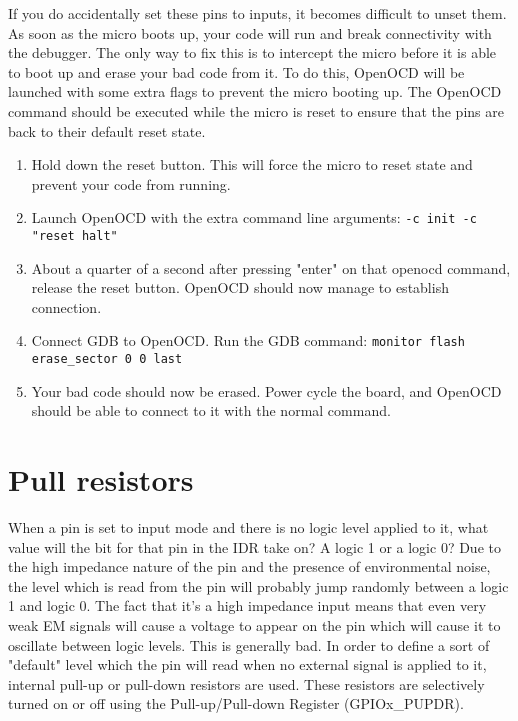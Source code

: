 If you do accidentally set these pins to inputs, it becomes difficult to unset them. As soon as the micro boots up, your code will run and break connectivity with the debugger. The only way to fix this is to intercept the micro before it is able to boot up and erase your bad code from it.
To do this, OpenOCD will be launched with some extra flags to prevent the micro booting up. The OpenOCD command should be executed while the micro is reset to ensure that the pins are back to their default reset state.
\begin{enumerate}
  \item Hold down the reset button. This will force the micro to reset state and prevent your code from running.
  \item Launch OpenOCD with the extra command line arguments: \texttt{-c init -c "reset halt"}
  \item About a quarter of a second after pressing "enter" on that openocd command, release the reset button. OpenOCD should now manage to establish connection.
  \item Connect GDB to OpenOCD. Run the GDB command: \texttt{monitor flash erase\_sector 0 0 last}
  \item Your bad code should now be erased. Power cycle the board, and OpenOCD should be able to connect to it with the normal command.
\end{enumerate}

\section{Pull resistors}
When a pin is set to input mode and there is no logic level applied to it, what value will the bit for that pin in the IDR take on? A logic 1 or a logic 0? Due to the high impedance nature of the pin and the presence of environmental noise, the level which is read from the pin will probably jump randomly between a logic 1 and logic 0. The fact that it's a high impedance input means that even very weak EM signals will cause a voltage to appear on the pin which will cause it to oscillate between logic levels. This is generally bad. In order to define a sort of "default" level which the pin will read when no external signal is applied to it, internal pull-up or pull-down resistors are used. These resistors are selectively turned on or off using the Pull-up/Pull-down Register (GPIOx\_PUPDR).


